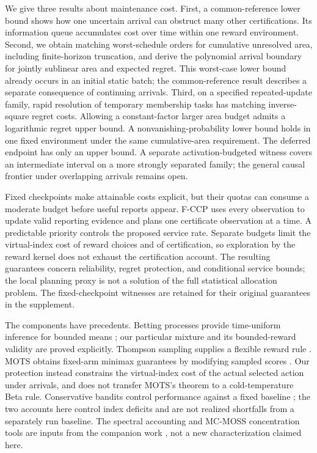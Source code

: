 \documentclass[11pt]{article}
\theoremstyle{remark}
\begin{document}
We give three results about maintenance cost. First, a common-reference
lower bound shows how one uncertain arrival can obstruct many other
certifications. Its information queue accumulates cost over time within
one reward environment. Second, we obtain matching worst-schedule orders
for cumulative unresolved area, including finite-horizon truncation, and
derive the polynomial arrival boundary for jointly sublinear area and
expected regret. This worst-case lower bound already occurs in an initial
static batch; the common-reference result describes a separate consequence
of continuing arrivals. Third, on a specified repeated-update family,
rapid resolution of temporary membership tasks has matching inverse-square
regret costs. Allowing a constant-factor larger area budget admits a
logarithmic regret upper bound. A nonvanishing-probability lower bound
holds in one fixed environment under the same cumulative-area requirement.
The deferred endpoint has only an upper bound. A separate activation-budgeted
witness covers an intermediate interval on a more strongly separated family;
the general causal frontier under overlapping arrivals remains open.


Fixed checkpoints make attainable costs explicit, but their quotas can
consume a moderate budget before useful reports appear. F-CCP uses every
observation to update valid reporting evidence and plans one certificate
observation at a time. A predictable priority controls the proposed
service rate. Separate budgets limit the virtual-index cost of reward
choices and of certification, so exploration by the reward kernel does
not exhaust the certification account. The resulting guarantees concern
reliability, regret protection, and conditional service bounds; the
local planning proxy is not a solution of the full statistical
allocation problem. The fixed-checkpoint witnesses are retained for
their original guarantees in the supplement.

The components have precedents. Betting processes provide time-uniform
inference for bounded means \citep{waudbysmith2024betting}; our particular
mixture and its bounded-reward validity are proved explicitly.
Thompson sampling supplies a flexible reward rule \citep{thompson1933}.
MOTS obtains fixed-arm minimax guarantees by modifying sampled scores
\citep{jin2021mots}. Our protection instead constrains the virtual-index
cost of the actual selected action under arrivals, and does not transfer
MOTS's theorem to a cold-temperature Beta rule. Conservative bandits
control performance against a fixed baseline \citep{wu2016conservative};
the two accounts here control index deficits and are not realized
shortfalls from a separately run baseline. The spectral accounting and
MC-MOSS concentration tools are inputs from the companion work
\citep{temporalgeometry2026}, not a new characterization claimed here.
\end{document}
